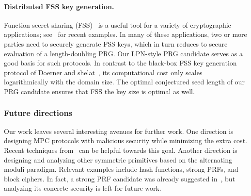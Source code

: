 \paragraph{Distributed FSS key generation.} Function secret sharing (FSS)~\cite{boyle2015-fss} is a useful tool for a variety of cryptographic applications; see~\cite{BoyleCGGIKR20,boyle2020-lpn-pcg} for recent examples. In many of these applications, two or more parties need to securely generate FSS keys, which in turn reduces to secure evaluation of a length-doubling PRG. Our LPN-style PRG candidate serves as a good basis for such protocols. In contrast to the black-box FSS key generation protocol of Doerner and shelat~\cite{DoernerS17}, its computational cost only scales logarithmically with the domain size. The optimal conjectured seed length of our PRG candidate ensures that FSS the key size is optimal as well.


\subsubsection{Future directions} Our work leaves several interesting avenues for further work. One direction is designing MPC protocols with malicious security while minimizing the extra cost. Recent techniques from~\cite{BBCGI19,BGIN19} can be helpful towards this goal. Another direction is designing and analyzing other symmetric primitives based on the alternating moduli paradigm. Relevant examples include hash functions, strong PRFs, and block ciphers.
In fact, a strong PRF candidate was already suggested in~\cite{boneh2018-darkmatter}, but analyzing its concrete security is left for future work.


%
